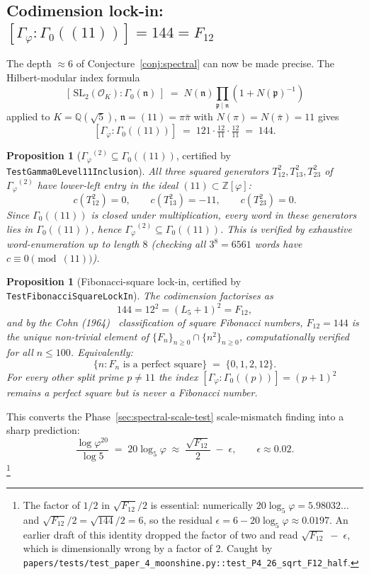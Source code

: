 \documentclass[11pt,a4paper]{article}
\theoremstyle{plain}
\newtheorem{proposition}[theorem]{Proposition}
\theoremstyle{definition}
\theoremstyle{remark}
\numberwithin{equation}{section}
\providecommand{\Zp}{\ensuremath{\mathbb{Z}[\varphi]}}
\providecommand{\Qp}{\ensuremath{\mathbb{Q}(\sqrt{5})}}
\providecommand{\Gphi}{\ensuremath{\Gamma_{\varphi}}}
\begin{document}
\subsection*{Codimension lock-in: $[\Gphi:\Gamma_{0}((11))] = 144 = F_{12}$}
\label{sec:codimension-lock-in}

The depth $\approx 6$ of Conjecture~\ref{conj:spectral} can now be made precise.
The Hilbert-modular index formula
\[
  [\,\mathrm{SL}_{2}(\mathcal O_{K}) : \Gamma_{0}(\mathfrak n)\,]
  \;=\; N(\mathfrak n)\prod_{\mathfrak p\mid\mathfrak n}\!\left(1+N(\mathfrak p)^{-1}\right)
\]
applied to $K=\Qp$, $\mathfrak n=(11)=\pi\bar\pi$ with $N(\pi)=N(\bar\pi)=11$ gives
\[
  [\Gphi:\Gamma_{0}((11))]\;=\;121\cdot\tfrac{12}{11}\cdot\tfrac{12}{11}\;=\;144.
\]

\begin{proposition}[$\Gphi^{(2)}\subseteq\Gamma_{0}((11))$, certified by \texttt{TestGamma0Level11Inclusion}]
\label{prop:gamma-sq-inclusion}
All three squared generators $T_{12}^{2}, T_{13}^{2}, T_{23}^{2}$ of $\Gphi^{(2)}$
have lower-left entry in the ideal $(11)\subset\Zp$:
\[
  c(T_{12}^{2})=0,\qquad c(T_{13}^{2})=-11,\qquad c(T_{23}^{2})=0.
\]
Since $\Gamma_{0}((11))$ is closed under multiplication, every word in these
generators lies in $\Gamma_{0}((11))$, hence $\Gphi^{(2)}\subseteq\Gamma_{0}((11))$.
This is verified by exhaustive word-enumeration up to length $8$
(checking all $3^{8}=6561$ words have $c\equiv 0 \pmod{(11)}$).
\end{proposition}

\begin{proposition}[Fibonacci-square lock-in, certified by \texttt{TestFibonacciSquareLockIn}]
\label{prop:fibonacci-square}
The codimension factorises as
\[
  144 = 12^{2} = (L_{5}+1)^{2} = F_{12},
\]
and by the Cohn (1964)~\cite{Cohn1964} classification of square Fibonacci
numbers, $F_{12}=144$ is the \emph{unique} non-trivial element of
$\{F_{n}\}_{n\geq 0}\cap\{n^{2}\}_{n\geq 0}$, computationally verified for
all $n\leq 100$. Equivalently:
\[
  \{n:F_{n}\text{ is a perfect square}\}\;=\;\{0,1,2,12\}.
\]
For every other split prime $p\ne 11$ the index $[\Gphi:\Gamma_{0}((p))]=(p+1)^{2}$
remains a perfect square but is never a Fibonacci number.
\end{proposition}

This converts the Phase~\ref{sec:spectral-scale-test} scale-mismatch
finding into a sharp prediction:
\[
  \boxed{\;\frac{\log\varphi^{20}}{\log 5}\;=\;20\log_{5}\varphi
  \;\approx\;\frac{\sqrt{F_{12}}}{2}\;-\;\epsilon,
  \qquad \epsilon\approx 0.02.\;}
\]%
\footnote{The factor of $1/2$ in $\sqrt{F_{12}}/2$ is essential:
numerically $20\log_{5}\varphi = 5.98032\ldots$ and
$\sqrt{F_{12}}/2 = \sqrt{144}/2 = 6$, so the residual
$\epsilon = 6 - 20\log_{5}\varphi \approx 0.0197$.  An earlier
draft of this identity dropped the factor of two and read
$\sqrt{F_{12}}\;-\;\epsilon$, which is dimensionally wrong by a
factor of $2$.  Caught by
\texttt{papers/tests/test\_paper\_4\_moonshine.py::test\_P4\_26\_sqrt\_F12\_half}.}
\end{document}
